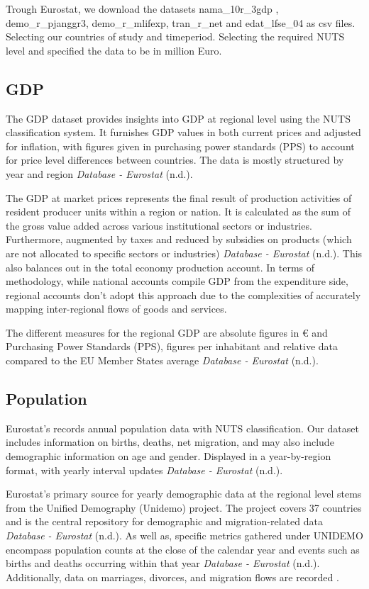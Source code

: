 \documentclass[
  a4paper,
  DIV=11,
  numbers=noendperiod]{scrartcl}
\begin{document}
Trough Eurostat, we download the datasets nama\_10r\_3gdp ,
demo\_r\_pjanggr3, demo\_r\_mlifexp, tran\_r\_net and edat\_lfse\_04 as
csv files. Selecting our countries of study and timeperiod. Selecting
the required NUTS level and specified the data to be in million Euro.

\hypertarget{gdp}{%
\subsection{GDP}\label{gdp}}

The GDP dataset provides insights into GDP at regional level using the
NUTS classification system. It furnishes GDP values in both current
prices and adjusted for inflation, with figures given in purchasing
power standards (PPS) to account for price level differences between
countries. The data is mostly structured by year and region
\emph{Database - Eurostat} (n.d.).

The GDP at market prices represents the final result of production
activities of resident producer units within a region or nation. It is
calculated as the sum of the gross value added across various
institutional sectors or industries. Furthermore, augmented by taxes and
reduced by subsidies on products (which are not allocated to specific
sectors or industries) \emph{Database - Eurostat} (n.d.). This also
balances out in the total economy production account. In terms of
methodology, while national accounts compile GDP from the expenditure
side, regional accounts don't adopt this approach due to the
complexities of accurately mapping inter-regional flows of goods and
services.

The different measures for the regional GDP are absolute figures in €
and Purchasing Power Standards (PPS), figures per inhabitant and
relative data compared to the EU Member States average \emph{Database -
Eurostat} (n.d.).

\hypertarget{population}{%
\subsection{Population}\label{population}}

Eurostat's records annual population data with NUTS classification. Our
dataset includes information on births, deaths, net migration, and may
also include demographic information on age and gender. Displayed in a
year-by-region format, with yearly interval updates \emph{Database -
Eurostat} (n.d.).

Eurostat's primary source for yearly demographic data at the regional
level stems from the Unified Demography (Unidemo) project. The project
covers 37 countries and is the central repository for demographic and
migration-related data \emph{Database - Eurostat} (n.d.). As well as,
specific metrics gathered under UNIDEMO encompass population counts at
the close of the calendar year and events such as births and deaths
occurring within that year \emph{Database - Eurostat} (n.d.).
Additionally, data on marriages, divorces, and migration flows are
recorded .
\end{document}
